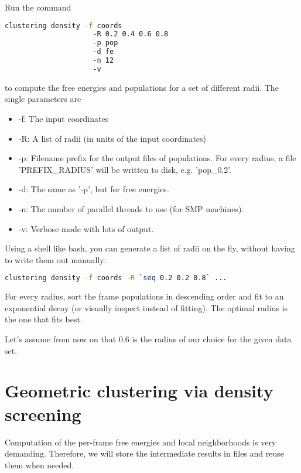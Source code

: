 \documentclass[12pt,a4paper,twoside,english,fleqn]{article}
\begin{document}
Run the command

\begin{lstlisting}[language=bash,basicstyle=\ttfamily]
  clustering density -f coords
                     -R 0.2 0.4 0.6 0.8
                     -p pop
                     -d fe
                     -n 12
                     -v
\end{lstlisting}

to compute the free energies and populations for a set of different radii.
The single parameters are
\begin{itemize}
  \item -f: The input coordinates
  \item -R: A list of radii (in units of the input coordinates)
  \item -p: Filename prefix for the output files of populations.
            For every radius, a file 'PREFIX\_RADIUS' will be written
            to disk, e.g. 'pop\_0.2'.
  \item -d: The same as '-p', but for free energies.
  \item -n: The number of parallel threads to use (for SMP machines).
  \item -v: Verbose mode with lots of output.
\end{itemize}

Using a shell like bash, you can generate a list of radii on the fly, without having to write them out manually:
\begin{lstlisting}[language=bash,basicstyle=\ttfamily]
  clustering density -f coords -R `seq 0.2 0.2 0.8` ...
\end{lstlisting}

For every radius, sort the frame populations in descending order and fit to an exponential decay (or visually inspect instead of fitting).
The optimal radius is the one that fits best.

Let's assume from now on that 0.6 is the radius of our choice for the given data set.


\section{Geometric clustering via density screening}
Computation of the per-frame free energies and local neighborhoods is very demanding.
Therefore, we will store the intermediate results in files and reuse them when needed.
\end{document}
